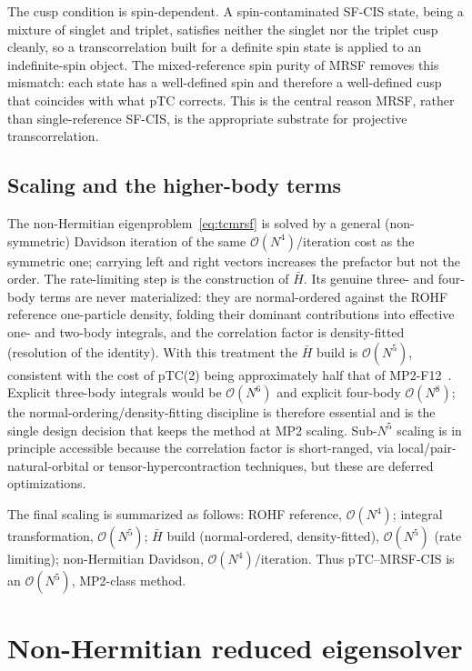\documentclass[aps,prb,reprint,superscriptaddress,floatfix]{revtex4-2}
\newcommand{\Hbar}{\bar{H}}
\begin{document}
The cusp condition is spin-dependent. A spin-contaminated SF-CIS state, being a
mixture of singlet and triplet, satisfies neither the singlet nor the triplet
cusp cleanly, so a transcorrelation built for a definite spin state is applied to
an indefinite-spin object. The mixed-reference spin purity of MRSF removes this
mismatch: each state has a well-defined spin and therefore a well-defined cusp
that coincides with what pTC corrects. This is the central reason MRSF, rather
than single-reference SF-CIS, is the appropriate substrate for projective
transcorrelation.

\subsection{Scaling and the higher-body terms}

The non-Hermitian eigenproblem~\eqref{eq:tcmrsf} is solved by a general
(non-symmetric) Davidson iteration of the same $\mathcal{O}(N^4)$/iteration cost
as the symmetric one; carrying left and right vectors increases the prefactor but
not the order. The rate-limiting step is the construction of $\Hbar$. Its genuine
three- and four-body terms are never materialized: they are normal-ordered
against the ROHF reference one-particle density, folding their dominant
contributions into effective one- and two-body integrals, and the correlation
factor is density-fitted (resolution of the identity). With this treatment the
$\Hbar$ build is $\mathcal{O}(N^5)$, consistent with the cost of pTC(2) being
approximately half that of MP2-F12~\cite{tenno2023}. Explicit three-body
integrals would be $\mathcal{O}(N^6)$ and explicit four-body $\mathcal{O}(N^8)$;
the normal-ordering/density-fitting discipline is therefore essential and is the
single design decision that keeps the method at MP2 scaling. Sub-$N^5$ scaling is
in principle accessible because the correlation factor is short-ranged, via
local/pair-natural-orbital or tensor-hypercontraction techniques, but these are
deferred optimizations.

The final scaling is summarized as follows: ROHF reference, $\mathcal{O}(N^4)$;
integral transformation, $\mathcal{O}(N^5)$; $\Hbar$ build (normal-ordered,
density-fitted), $\mathcal{O}(N^5)$ (rate limiting); non-Hermitian Davidson,
$\mathcal{O}(N^4)$/iteration. Thus pTC--MRSF-CIS is an $\mathcal{O}(N^5)$,
MP2-class method.

\section{Non-Hermitian reduced eigensolver}
\end{document}

